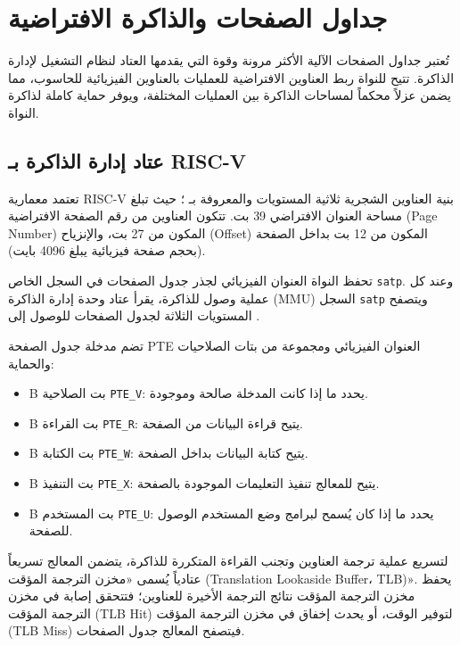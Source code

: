 \chapter{جداول الصفحات والذاكرة الافتراضية}
\label{chap:mem}

تُعتبر جداول الصفحات الآلية الأكثر مرونة وقوة التي يقدمها العتاد لنظام التشغيل لإدارة الذاكرة.
تتيح  للنواة ربط العناوين الافتراضية للعمليات بالعناوين الفيزيائية للحاسوب،
مما يضمن عزلاً محكماً لمساحات الذاكرة بين العمليات المختلفة، ويوفر حماية كاملة لذاكرة النواة.

\section{عتاد إدارة الذاكرة بـ RISC-V}

تعتمد معمارية RISC-V بنية العناوين الشجرية ثلاثية المستويات والمعروفة بـ ؛
حيث تبلغ مساحة العنوان الافتراضي 39 بت.
تتكون العناوين من رقم الصفحة الافتراضية (Page Number) المكون من 27 بت، والإنزياح (Offset) المكون من 12 بت بداخل الصفحة (بحجم صفحة فيزيائية يبلغ 4096 بايت).

تحفظ النواة العنوان الفيزيائي لجذر جدول الصفحات في السجل الخاص \texttt{satp}.
وعند كل عملية وصول للذاكرة، يقرأ عتاد وحدة إدارة الذاكرة (MMU) السجل \texttt{satp} ويتصفح المستويات الثلاثة لجدول الصفحات للوصول إلى .

تضم مدخلة جدول الصفحة PTE العنوان الفيزيائي ومجموعة من بتات الصلاحيات والحماية:
\begin{itemize}
\item B بت الصلاحية \texttt{PTE\_V}: يحدد ما إذا كانت المدخلة صالحة وموجودة.
\item B بت القراءة \texttt{PTE\_R}: يتيح قراءة البيانات من الصفحة.
\item B بت الكتابة \texttt{PTE\_W}: يتيح كتابة البيانات بداخل الصفحة.
\item B بت التنفيذ \texttt{PTE\_X}: يتيح للمعالج تنفيذ التعليمات الموجودة بالصفحة.
\item B بت المستخدم \texttt{PTE\_U}: يحدد ما إذا كان يُسمح لبرامج وضع المستخدم الوصول للصفحة.
\end{itemize}

لتسريع عملية ترجمة العناوين وتجنب القراءة المتكررة للذاكرة، يتضمن المعالج تسريعاً عتادياً يُسمى «مخزن الترجمة المؤقت (Translation Lookaside Buffer، TLB)».
يحفظ مخزن الترجمة المؤقت نتائج الترجمة الأخيرة للعناوين؛ فتتحقق إصابة في مخزن الترجمة المؤقت (TLB Hit) لتوفير الوقت، أو يحدث إخفاق في مخزن الترجمة المؤقت (TLB Miss) فيتصفح المعالج جدول الصفحات.

